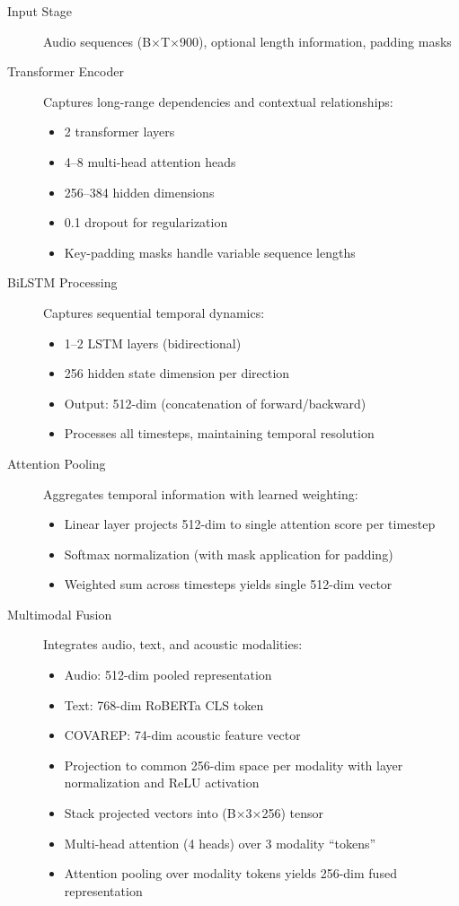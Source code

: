 \documentclass[12pt]{article}
\begin{document}
	\begin{description}
		\item[Input Stage] Audio sequences (B×T×900), optional length information, padding masks

		\item[Transformer Encoder] Captures long-range dependencies and contextual relationships:
		\begin{itemize}
			\item 2 transformer layers
			\item 4--8 multi-head attention heads
			\item 256--384 hidden dimensions
			\item 0.1 dropout for regularization
			\item Key-padding masks handle variable sequence lengths
		\end{itemize}

		\item[BiLSTM Processing] Captures sequential temporal dynamics:
		\begin{itemize}
			\item 1--2 LSTM layers (bidirectional)
			\item 256 hidden state dimension per direction
			\item Output: 512-dim (concatenation of forward/backward)
			\item Processes all timesteps, maintaining temporal resolution
		\end{itemize}

		\item[Attention Pooling] Aggregates temporal information with learned weighting:
		\begin{itemize}
			\item Linear layer projects 512-dim to single attention score per timestep
			\item Softmax normalization (with mask application for padding)
			\item Weighted sum across timesteps yields single 512-dim vector
		\end{itemize}

		\item[Multimodal Fusion] Integrates audio, text, and acoustic modalities:
		\begin{itemize}
			\item Audio: 512-dim pooled representation
			\item Text: 768-dim RoBERTa CLS token
			\item COVAREP: 74-dim acoustic feature vector
			\item Projection to common 256-dim space per modality with layer normalization and ReLU activation
			\item Stack projected vectors into (B×3×256) tensor
			\item Multi-head attention (4 heads) over 3 modality ``tokens''
			\item Attention pooling over modality tokens yields 256-dim fused representation
		\end{itemize}


\end{description}
\end{document}
